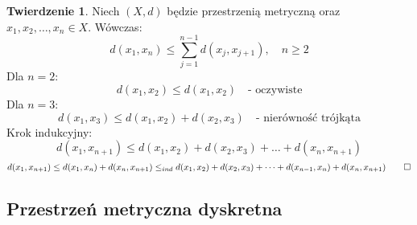 \documentclass{article}
\theoremstyle{definition}
\theoremstyle{definition}
\newtheorem{tw}{Twierdzenie}[subsection]
\theoremstyle{definition}
\theoremstyle{definition}
\theoremstyle{definition}
\theoremstyle{definition}
\theoremstyle{definition}
\begin{document}
\begin{tw}
    Niech $(X,d)$ będzie przestrzenią metryczną oraz $x_1,x_2,\dots,x_n \in X$. Wówczas:
    \[
    d(x_1,x_n) \leq \sum_{j=1}^{n-1} d(x_j,x_{j+1}), \quad n \geq 2
    \]
    Dla $n=2$:
    \[
    d(x_1,x_2) \leq d(x_1,x_2) \quad \text{- oczywiste}
    \]
    Dla $n=3$:
    \[
    d(x_1,x_3) \leq d(x_1,x_2) + d(x_2,x_3) \quad \text{- nierówność trójkąta}
    \]
    Krok indukcyjny:
    \[
    d(x_1,x_{n+1}) \leq d(x_1,x_2) + d(x_2,x_3) + \dots + d(x_n,x_{n+1})
    \]
    \[
    d(x_1,x_{n+1}) \leq d(x_1,x_n) + d(x_n,x_{n+1}) \leq_{ind}
    d(x_1,x_2) + d(x_2,x_3) + \dots + d(x_{n-1}, x_n) + d(x_{n},x_{n+1}) \qed
    \]
\end{tw}   

\subsection{Przestrzeń metryczna dyskretna}
\end{document}
